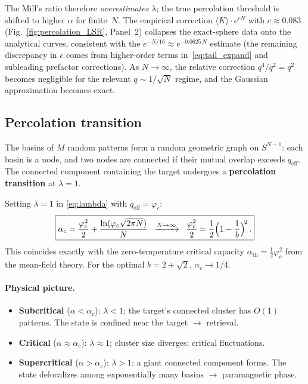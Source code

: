 \documentclass[11pt]{article}
\newcommand{\vp}{\varphi}
\begin{document}
The Mill's ratio therefore \emph{overestimates} $\lambda$;
the true percolation threshold is shifted to higher $\alpha$
for finite~$N$.  The empirical correction
$\langle K \rangle \cdot e^{cN}$ with $c \approx 0.083$
(Fig.~\ref{fig:percolation_LSR}, Panel~2)
collapses the exact-sphere data onto the analytical curves,
consistent with the $e^{-N/16} \approx e^{-0.0625\,N}$ estimate
(the remaining discrepancy in $c$ comes from higher-order
terms in~\eqref{eq:tail_expand} and subleading prefactor
corrections).
As $N \to \infty$, the relative correction $q^4/q^2 = q^2$
becomes negligible for the relevant $q \sim 1/\sqrt{N}$ regime,
and the Gaussian approximation becomes exact.

\subsection{Percolation transition}

The basins of $M$ random patterns form a random geometric graph
on $S^{N-1}$: each basin is a node, and two nodes are connected
if their mutual overlap exceeds $q_\mathrm{eff}$.
The connected component containing the target undergoes a
\textbf{percolation transition} at $\lambda = 1$.

Setting $\lambda = 1$ in \eqref{eq:lambda} with
$q_\mathrm{eff} = \vp_c$:
\begin{equation}\label{eq:alpha_c}
  \boxed{\alpha_c = \frac{\vp_c^2}{2} + \frac{\ln(\vp_c\sqrt{2\pi N})}{N}
    \;\;\xrightarrow{N\to\infty}\;\;
    \frac{\vp_c^2}{2}
    = \frac{1}{2}\Bigl(1 - \frac{1}{b}\Bigr)^{\!2}\,.}
\end{equation}
This coincides exactly with the zero-temperature critical capacity
$\alpha_\mathrm{th} = \tfrac{1}{2}\vp_c^2$
from the mean-field theory.
For the optimal $b = 2 + \sqrt{2}$, $\alpha_c \to 1/4$.

\paragraph{Physical picture.}
\begin{itemize}
  \item \textbf{Subcritical} ($\alpha < \alpha_c$):
    $\lambda < 1$; the target's connected cluster has $O(1)$
    patterns.  The state is confined near the target $\to$ retrieval.
  \item \textbf{Critical} ($\alpha \approx \alpha_c$):
    $\lambda \approx 1$; cluster size diverges; critical fluctuations.
  \item \textbf{Supercritical} ($\alpha > \alpha_c$):
    $\lambda > 1$; a giant connected component forms.
    The state delocalizes among exponentially many basins
    $\to$ paramagnetic phase.
\end{itemize}
\end{document}
